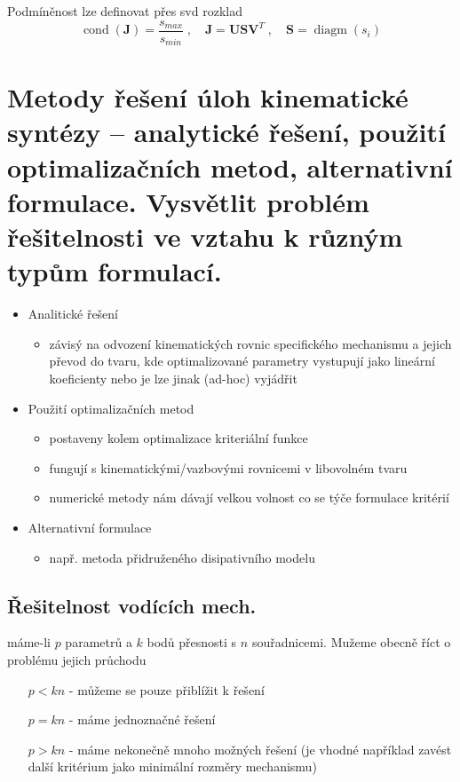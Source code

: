 \documentclass{article}
\begin{document}
	Podmíněnost lze definovat přes svd rozklad
	\begin{equation}
		\operatorname{cond}(\bm{J}) = \frac{s_{max}}{s_{min}}
		\;,\quad 
		\bm{J} = \bm{U} \bm{S} \bm{V}^T
		\;,\quad 
		\bm{S} = \operatorname{diagm}(s_i)
	\end{equation}

	\section{Metody řešení úloh kinematické syntézy – analytické řešení, použití optimalizačních metod, alternativní formulace. Vysvětlit problém řešitelnosti ve vztahu k různým typům formulací.}

	\begin{itemize}
	\item Analitické řešení
	\begin{itemize}
		\item závisý na odvození kinematických rovnic specifického mechanismu a jejich převod do tvaru, kde optimalizované parametry vystupují jako lineární koeficienty nebo je lze jinak (ad-hoc) vyjádřit
	\end{itemize}
	\item Použití optimalizačních metod
		\begin{itemize}
		\item postaveny kolem optimalizace kriteriální funkce
		\item fungují s kinematickými/vazbovými rovnicemi v libovolném tvaru
		\item numerické metody nám dávají velkou volnost co se týče formulace kritérií
		\end{itemize}
	\item Alternativní formulace
		\begin{itemize}
		\item např. metoda přidruženého disipativního modelu
		\end{itemize}
	\end{itemize}

	\subsection*{Řešitelnost vodících mech.}
	máme-li $p$ parametrů a $k$ bodů přesnosti s $n$ souřadnicemi. Mužeme obecně říct o problému jejich průchodu
	\begin{itemize}
		\item [$p<kn$] - můžeme se pouze přiblížit k řešení
		\item [$p=kn$] - máme jednoznačné řešení
		\item [$p>kn$] - máme nekonečně mnoho možných řešení (je vhodné například zavést další kritérium jako minimální rozměry mechanismu)
	\end{itemize}
\end{document}
